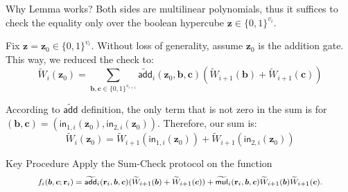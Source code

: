 \documentclass{zkdl-presentation-template}
\begin{document}
    \begin{frame}{Why Lemma works?}
        Both sides are multilinear polynomials, thus it suffices to check the equality only over the
        boolean hypercube $\mathbf{z} \in \{0,1\}^{v_i}$.
        \pause

        Fix $\mathbf{z}=\mathbf{z}_0 \in \{0,1\}^{v_i}$. Without loss of generality, assume
        $\mathbf{z}_0$ is the addition gate. This way, we reduced the check to:
        \begin{equation*}
            \widetilde{W}_i(\mathbf{z}_0) = \sum_{\boldsymbol{b},\boldsymbol{c} \in \{0,1\}^{v_{i+1}}} \widetilde{\mathsf{add}}_i(\mathbf{z}_0,\boldsymbol{b},\boldsymbol{c})(\widetilde{W}_{i+1}(\boldsymbol{b}) + \widetilde{W}_{i+1}(\boldsymbol{c}))
        \end{equation*}
        \pause

         According to $\widetilde{\mathsf{add}}$ definition, the only term that is not
        zero in the sum is for
        $(\boldsymbol{b},\boldsymbol{c})=(\mathsf{in}_{1,i}(\mathbf{z}_0),
        \mathsf{in}_{2,i}(\mathbf{z}_0))$. Therefore, our sum is:
        \begin{equation*}
            \widetilde{W}_i(\mathbf{z}_0) = \widetilde{W}_{i+1}(\mathsf{in}_{1,i}(\mathbf{z}_0)) + \widetilde{W}_{i+1}(\mathsf{in}_{2,i}(\mathbf{z}_0))
        \end{equation*}
        \pause

        \vspace{-5px}
        \begin{block}{Key Procedure}
            Apply the Sum-Check protocol on the function
            \begin{equation*}
                \footnotesize f_i(\boldsymbol{b}, \boldsymbol{c}; \mathbf{r}_i) = \widetilde{\mathsf{add}}_i(\mathbf{r}_i, \boldsymbol{b}, \boldsymbol{c})(\widetilde{W}_{i+1}(\boldsymbol{b}) + \widetilde{W}_{i+1}(\boldsymbol{c})) + \widetilde{\mathsf{mul}}_i(\mathbf{r}_i, \boldsymbol{b}, \boldsymbol{c})\widetilde{W}_{i+1}(\boldsymbol{b})\widetilde{W}_{i+1}(\boldsymbol{c}).
            \end{equation*}
        \end{block}
    \end{frame}
\end{document}
